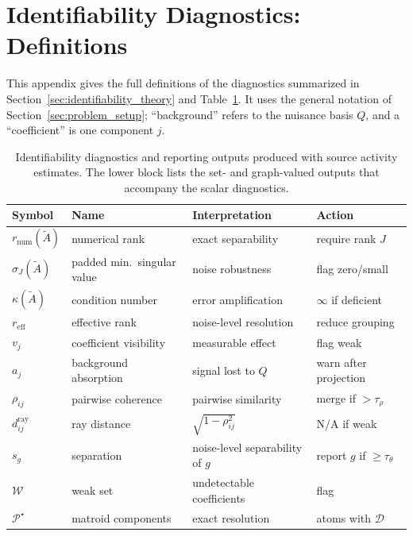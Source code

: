 \section{Identifiability Diagnostics: Definitions}
\label{app:diagnostics_definitions}

This appendix gives the full definitions of the diagnostics summarized in
Section~\ref{sec:identifiability_theory} and Table~\ref{tab:diagnostics}.
It uses the general notation of Section~\ref{sec:problem_setup}; ``background'' refers to
the nuisance basis \(Q\), and a ``coefficient'' is one component \(j\).

\begin{table}[t]
\centering
\small
\setlength{\tabcolsep}{3pt}
\caption{Identifiability diagnostics and reporting outputs produced with source
activity estimates.  The lower block lists the set- and graph-valued outputs that
accompany the scalar diagnostics.}
\label{tab:diagnostics}
\begin{tabularx}{\columnwidth}{l
  >{\raggedright\arraybackslash}X
  >{\raggedright\arraybackslash}X
  >{\raggedright\arraybackslash}X}
\toprule
Symbol & Name & Interpretation & Action \\
\midrule
\(r_{\mathrm{num}}(\widetilde A)\) & numerical rank & exact separability & require rank \(J\) \\
\(\sigma_J(\widetilde A)\) & padded min.\ singular value & noise robustness & flag zero/small \\
\(\kappa(\widetilde A)\) & condition number & error amplification & \(\infty\) if deficient \\
\(r_{\mathrm{eff}}\) & effective rank & noise-level resolution & reduce grouping \\
\(v_j\) & coefficient visibility & measurable effect & flag weak \\
\(a_j\) & background absorption & signal lost to \(Q\) & warn after projection \\
\(\rho_{ij}\) & pairwise coherence & pairwise similarity & merge if \(>\tau_\rho\) \\
\(d^{\mathrm{ray}}_{ij}\) & ray distance & \(\sqrt{1-\rho_{ij}^2}\) & N/A if weak \\
\(s_g\) & separation & noise-level separability of \(g\) & report \(g\) if \(\ge\tau_\theta\) \\
\midrule
\(\mathcal W\) & weak set & undetectable coefficients & flag \\
\(\mathcal P^\star\) & matroid components & exact resolution & atoms with \(\mathcal D\) \\
\bottomrule
\end{tabularx}
\end{table}

